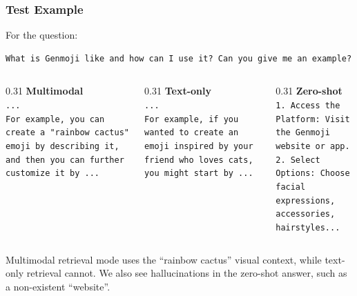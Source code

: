 \documentclass[aspectratio=1610]{beamer}
\begin{document}
    \begin{frame}[fragile]
        \frametitle{Test Example}
        For the question:
        \footnotesize
        \begin{verbatim}
What is Genmoji like and how can I use it? Can you give me an example?
        \end{verbatim}
        \normalsize

        \begin{columns}[T, onlytextwidth]
            \begin{column}{0.31\textwidth}
                \textbf{Multimodal}\\\smallskip
                \footnotesize
                \texttt{...\\For example, you can create a "rainbow cactus" emoji by describing it, and then you can further customize it by ...}
            \end{column}
            
            \begin{column}{0.31\textwidth}
                \textbf{Text-only}\\\smallskip
                \footnotesize
                \texttt{...\\For example, if you wanted to create an emoji inspired by your friend who loves cats, you might start by ...}
            \end{column}
            
            \begin{column}{0.31\textwidth}
                \textbf{Zero-shot}\\\smallskip
                \footnotesize
                \texttt{1. Access the Platform: Visit the Genmoji website or app. \\ 2. Select Options: Choose facial expressions, accessories, hairstyles...}
            \end{column}
        \end{columns}
        \vspace{2mm}
        
        \normalsize
        Multimodal retrieval mode uses the ``rainbow cactus'' visual context, while text-only retrieval cannot.
        We also see hallucinations in the zero-shot answer, such as a non-existent ``website''.
    \end{frame}
\end{document}
